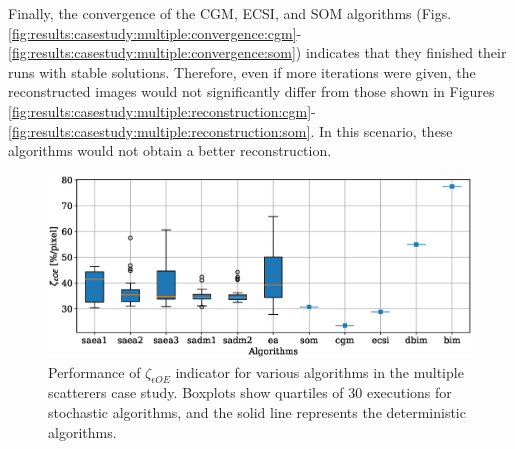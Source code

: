 			Finally, the convergence of the CGM, ECSI, and SOM algorithms (Figs. \ref{fig:results:casestudy:multiple:convergence:cgm}-\ref{fig:results:casestudy:multiple:convergence:som}) indicates that they finished their runs with stable solutions. Therefore, even if more iterations were given, the reconstructed images would not significantly differ from those shown in Figures \ref{fig:results:casestudy:multiple:reconstruction:cgm}-\ref{fig:results:casestudy:multiple:reconstruction:som}. In this scenario, these algorithms would not obtain a better reconstruction.
		
			\begin{figure}
				\centering
				\includegraphics[width=.9\textwidth]{./figuras/casestudy/multiple/boxplot_zeta_eoe}
				\caption[Performance of $\zeta_{\epsilon OE}$ indicator for various algorithms in the multiple scatterers case study.]{Performance of $\zeta_{\epsilon OE}$ indicator for various algorithms in the multiple scatterers case study. Boxplots show quartiles of 30 executions for stochastic algorithms, and the solid line represents the deterministic algorithms.}
				\label{fig:results:casestudy:multiple:boxplot:zeta_eoe}
			\end{figure}
		
		
